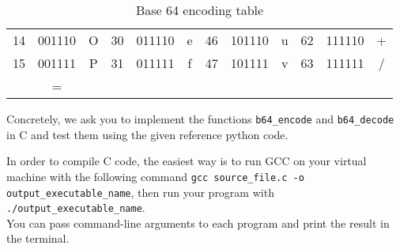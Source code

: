 \documentclass[a4paper,11pt]{article}
\begin{document}
\begin{table}[h]
\begin{tabular}{ccc|ccc|ccc|ccc}
		\rowcolor[HTML]{F8F9FA}
		{\color[HTML]{202122} 14}             & {\color[HTML]{202122} 001110}          & {\color[HTML]{202122} O}             & {\color[HTML]{202122} 30}             & {\color[HTML]{202122} 011110}          & {\color[HTML]{202122} e}             & {\color[HTML]{202122} 46}             & {\color[HTML]{202122} 101110}          & {\color[HTML]{202122} u}             & {\color[HTML]{202122} 62}             & {\color[HTML]{202122} 111110}          & {\color[HTML]{202122} +}             \\
		\rowcolor[HTML]{F8F9FA}
		{\color[HTML]{202122} 15}             & {\color[HTML]{202122} 001111}          & {\color[HTML]{202122} P}             & {\color[HTML]{202122} 31}             & {\color[HTML]{202122} 011111}          & {\color[HTML]{202122} f}             & {\color[HTML]{202122} 47}             & {\color[HTML]{202122} 101111}          & {\color[HTML]{202122} v}             & {\color[HTML]{202122} 63}             & {\color[HTML]{202122} 111111}          & {\color[HTML]{202122} /}             \\
		\rowcolor[HTML]{F8F9FA}
		\multicolumn{2}{c}{\cellcolor[HTML]{ECECEC}{\color[HTML]{2C2C2C} Padding}}     & {\color[HTML]{202122} =}             & {\color[HTML]{202122} }               & {\color[HTML]{202122} }                & {\color[HTML]{202122} }              & {\color[HTML]{202122} }               & {\color[HTML]{202122} }                & {\color[HTML]{202122} }              & {\color[HTML]{202122} }               & {\color[HTML]{202122} }                & {\color[HTML]{202122} }
	\end{tabular}
	\caption{Base 64 encoding table}
	\label{tab:b64}
\end{table}

Concretely, we ask you to implement the functions \texttt{b64\_encode} and \texttt{b64\_decode} in C and test them using the given reference python code.

In order to compile C code, the easiest way is to run GCC on your virtual machine with the following command \hspace{3mm}\texttt{gcc source\_file.c -o output\_executable\_name}\hspace{3mm}, then run your program with \hspace{3mm} \texttt{./output\_executable\_name}\hspace{3mm}.\\

You can pass command-line arguments to each program and print the result in the terminal.
\end{document}
